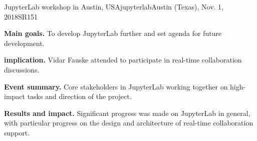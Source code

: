 \begin{event}{JupyterLab workshop in Austin, USA}{jupyterlab}{Austin (Texas), Nov. 1, 2018}{SR}{15}{1}{}

\textbf{Main goals.} To develop JupyterLab further and set agenda for future development.

\textbf{\ODK implication.} Vidar Fauske attended to participate in real-time collaboration discussions.

\textbf{Event summary.} Core stakeholders in JupyterLab working together on high-impact tasks and direction of the project.

\textbf{Results and impact.} Significant progress was made on JupyterLab in general, with particular progress on the design and architecture of real-time collaboration support.

\end{event}

